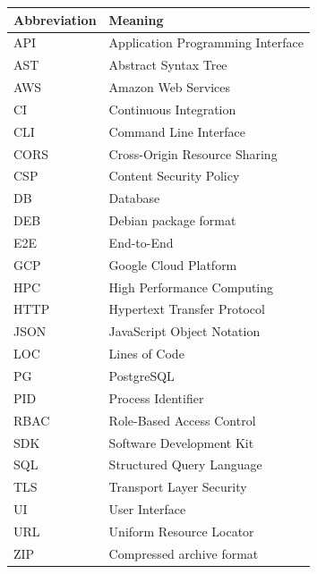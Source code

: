 \documentclass[11pt,a4paper]{article}
\begin{document}
\begin{tabularx}{\textwidth}{@{}lX@{}}
\textbf{Abbreviation} & \textbf{Meaning} \\
\hline

API  & Application Programming Interface \\
AST  & Abstract Syntax Tree \\
AWS  & Amazon Web Services \\
CI   & Continuous Integration \\
CLI  & Command Line Interface \\
CORS & Cross-Origin Resource Sharing \\
CSP  & Content Security Policy \\
DB   & Database \\
DEB  & Debian package format \\
E2E  & End-to-End \\
GCP  & Google Cloud Platform \\
HPC  & High Performance Computing \\
HTTP & Hypertext Transfer Protocol \\
JSON & JavaScript Object Notation \\
LOC  & Lines of Code \\
PG   & PostgreSQL \\
PID  & Process Identifier \\
RBAC & Role-Based Access Control \\
SDK  & Software Development Kit \\
SQL  & Structured Query Language \\
TLS  & Transport Layer Security \\
UI   & User Interface \\
URL  & Uniform Resource Locator \\
ZIP  & Compressed archive format \\

\end{tabularx}

\clearpage
{}
\setcounter{page}{1}










\end{document}

